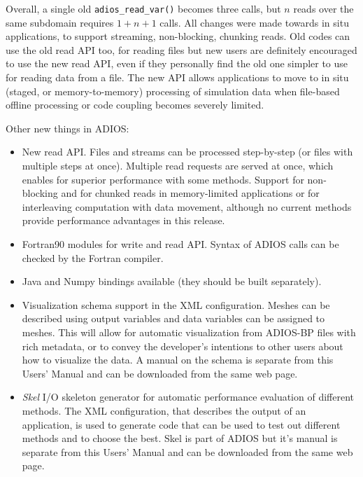 Overall, a single old \verb+adios_read_var()+ becomes three calls, but $n$ reads over the same subdomain requires $1+n+1$ calls.  
All changes were made towards in situ applications, to support streaming, non-blocking, chunking reads. 
Old codes can use the old read API too, for reading files but new users are definitely encouraged to use the new read API, even if they personally find the old one simpler to use for reading data from a file. The new API allows applications to move to in situ (staged, or memory-to-memory) processing of simulation data when file-based offline processing or code coupling becomes severely limited.  

Other new things in ADIOS:
\begin{itemize}
\item New read API. Files and streams can be processed step-by-step (or files with multiple steps at once). Multiple read requests are served at once, which enables for superior performance with some methods. Support for non-blocking and for chunked reads in memory-limited applications or for interleaving computation with data movement, although no current methods provide performance advantages in this release.  
\item Fortran90 modules for write and read API. Syntax of ADIOS calls can be checked by the Fortran compiler.
\item Java and Numpy bindings available (they should be built separately).
\item Visualization schema support in the XML configuration. Meshes can be described using output variables and data variables can be assigned to meshes. This will allow for automatic visualization from ADIOS-BP files with rich metadata, or to convey the developer's intentions to other users about how to visualize the data. A manual on the schema is separate from this Users' Manual and can be downloaded from the same web page. 
\item \emph{Skel} I/O skeleton generator for automatic performance evaluation of different methods. The XML configuration, that describes the output of an application, is used to generate code that can be used to test out different methods and to choose the best. Skel is part of ADIOS but it's manual is separate from this Users' Manual and can be downloaded from the same web page. 
\end{itemize}

